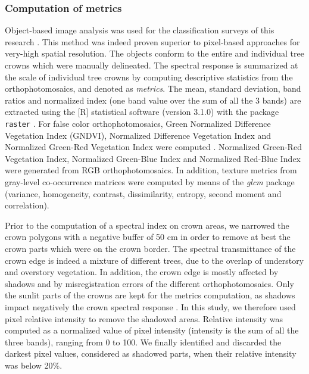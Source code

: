 \documentclass[remotesensing,article,submit,moreauthors,pdftex,12pt,a4paper]{mdpi} %
\begin{document}
\subsubsection{Computation of metrics}

Object-based image analysis was used for the classification surveys of this research \cite{blaschke_object_2010}. 
This method was indeed proven superior to pixel-based approaches for very-high spatial resolution. 
The objects conform to the entire and individual tree crowns which were manually delineated. 
The spectral response is summarized at the scale of individual tree crowns by computing descriptive statistics from the orthophotomosaics, and denoted as \textit{metrics}. 
The mean, standard deviation, band ratios and normalized index (one band value over the sum of all the 3 bands) are extracted using the [R] statistical software (version 3.1.0) with the package {\tt raster} \cite{etten_raster:_2014}. 
For false color orthophotomosaics, Green Normalized Difference Vegetation Index (GNDVI), Normalized Difference Vegetation Index and Normalized Green-Red Vegetation Index were computed \cite{sripada_aerial_2006,motohka_applicability_2010}. 
Normalized Green-Red Vegetation Index, Normalized Green-Blue Index and Normalized Red-Blue Index were generated from RGB orthophotomosaics. 
In addition, texture metrics from gray-level co-occurrence matrices were computed by means of the \textit{glcm} package (variance, homogeneity, contrast, dissimilarity, entropy, second moment and correlation).

Prior to the computation of a spectral index on crown areas, we narrowed the crown polygons with a negative buffer of 50 cm in order to remove at best the crown parts which were on the crown border. 
The spectral transmittance of the crown edge is indeed a mixture of different trees, due to the overlap of understory and overstory vegetation. 
In addition, the crown edge is mostly affected by shadows and by misregistration errors of the different orthophotomosaics.
Only the sunlit parts of the crowns are kept for the metrics computation, as shadows impact negatively the crown spectral response \cite{immitzer_tree_2012,heinzel_full_2008}. 
In this study, we therefore used pixel relative intensity to remove the shadowed areas.
Relative intensity was computed as a normalized value of pixel intensity (intensity is the sum of all the three bands), ranging from 0 to 100.
We finally identified and discarded the darkest pixel values, considered as shadowed parts, when their relative intensity was below 20\%. 
\end{document}
